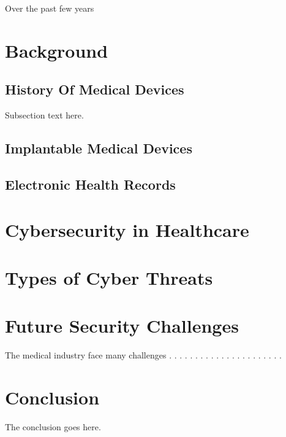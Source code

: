 \documentclass{IEEEtran}
\begin{document}
Over the past few years

\section{Background}
\subsection{History Of Medical Devices}
Subsection text here.
\subsection{Implantable Medical Devices}
\subsection{Electronic Health Records}


\section{Cybersecurity in Healthcare}

\section{Types of Cyber Threats}

\section{Future Security Challenges}

The medical industry face many challenges \cite{Sametinger}.
\cite{williams2015cybersecurity}.
\cite{moses2015lack}.
\cite{ferrara2019cybersecurity}.
\cite{murphy2015cybersecurity}.
\cite{stites2016secure}.
\cite{InformationSecurityonDiagnosticImagingSystem}.
\cite{Ray}.
\cite{gerard2013cybersecurity}.
\cite{mahler2018know}.
\cite{ma2019medical}.
\cite{busdicker2017role}.
\cite{martin2017cybersecurity}.
\cite{Marwan}.
\cite{FooKune:2012:TSI:2342536.2342540}.
\cite{Almohri:2017:TMM:3204094.3204113}.
\cite{tk2013inside}.
\cite{fu2014controlling}.
\cite{tanev2015value}.
\cite{Sametinger:2015:SCM:2749359.2667218}.
\cite{tanev2015value}.
\cite{CyberSecurity}.


\section{Conclusion}
The conclusion goes here.





\end{document}
